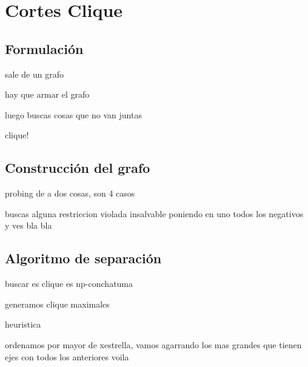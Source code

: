 \section{Cortes Clique}

\bigskip
\subsection{Formulaci\'on}

sale de un grafo

hay que armar el grafo

luego buscas cosas que no van juntas

clique!



\bigskip
\subsection{Construcci\'on del grafo}

probing de a dos cosas, son 4 casos

buscas alguna restriccion violada insalvable poniendo en uno todos los negativos y ves bla bla


\bigskip
\subsection{Algoritmo de separaci\'on}


buscar es clique es np-conchatuma

generamos clique maximales

heuristica

ordenamos por mayor de xestrella, vamos agarrando los mas grandes que tienen ejes con todos los anteriores voila